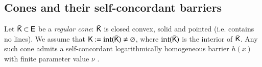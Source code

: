%
\subsection{Cones and their self-concordant barriers}
Let $\bar{\mathsf{K}}\subset\mathsf{E}$ be a \emph{regular cone}: $\bar{\mathsf{K}}$ is closed convex, solid and pointed (i.e. contains no lines). 
We assume that $\mathsf{K}:=\operatorname{int}(\bar{\mathsf{K}}) \neq \varnothing$, where $\operatorname{int}(\bar{\mathsf{K}})$ is the interior of $\bar{\mathsf{K}}$. Any such cone admits a self-concordant logarithmically homogeneous barrier $h(x)$ with finite parameter value $\nu$ \cite{NesNem94}.

